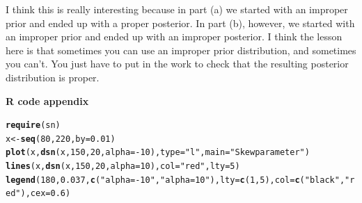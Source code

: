 \documentclass[12pt]{article}\usepackage[]{graphicx}\usepackage[]{color}
\makeatletter
\newcommand{\hlnum}[1]{\textcolor[rgb]{0.686,0.059,0.569}{#1}}%
\newcommand{\hlstr}[1]{\textcolor[rgb]{0.192,0.494,0.8}{#1}}%
\newcommand{\hlopt}[1]{\textcolor[rgb]{0,0,0}{#1}}%
\newcommand{\hlstd}[1]{\textcolor[rgb]{0.345,0.345,0.345}{#1}}%
\newcommand{\hlkwb}[1]{\textcolor[rgb]{0.69,0.353,0.396}{#1}}%
\newcommand{\hlkwc}[1]{\textcolor[rgb]{0.333,0.667,0.333}{#1}}%
\newcommand{\hlkwd}[1]{\textcolor[rgb]{0.737,0.353,0.396}{\textbf{#1}}}%
\newenvironment{kframe}{%
 \def\at@end@of@kframe{}%
 \ifinner\ifhmode%
  \def\at@end@of@kframe{\end{minipage}}%
  \begin{minipage}{\columnwidth}%
 \fi\fi%
 \def\FrameCommand##1{\hskip\@totalleftmargin \hskip-\fboxsep
 \colorbox{shadecolor}{##1}\hskip-\fboxsep
     \hskip-\linewidth \hskip-\@totalleftmargin \hskip\columnwidth}%
 \MakeFramed {\advance\hsize-\width
   \@totalleftmargin\z@ \linewidth\hsize
   \@setminipage}}%
 {\par\unskip\endMakeFramed%
 \at@end@of@kframe}
\newenvironment{knitrout}{}{} %
\makeatother
\begin{document}
\begin{doublespacing}
\begin{enumerate}
\begin{enumerate}
\begin{singlespace}
\begin{knitrout}
\end{knitrout}
\end{singlespace}

I think this is really interesting because in part (a) we started with an improper prior and ended up with a proper posterior. In part (b), however, we started with an improper prior and ended up with an improper posterior. I think the lesson here is that sometimes you can use an improper prior distribution, and sometimes you can't. You just have to put in the work to check that the resulting posterior distribution is proper.


\end{enumerate}

\end{enumerate}
\end{doublespacing}

\newpage
{\bf \large R code appendix}

\begin{knitrout}\footnotesize
{}\color{fgcolor}\begin{kframe}
\begin{alltt}
\hlkwd{require}\hlstd{(sn)}
\hlstd{x} \hlkwb{<-} \hlkwd{seq}\hlstd{(}\hlnum{80}\hlstd{,} \hlnum{220}\hlstd{,} \hlkwc{by}\hlstd{=}\hlnum{0.01}\hlstd{)}
\hlkwd{plot}\hlstd{(x,} \hlkwd{dsn}\hlstd{(x,} \hlnum{150}\hlstd{,} \hlnum{20}\hlstd{,} \hlkwc{alpha}\hlstd{=}\hlopt{-}\hlnum{10}\hlstd{),} \hlkwc{type}\hlstd{=}\hlstr{"l"}\hlstd{,} \hlkwc{main}\hlstd{=}\hlstr{"Skew parameter"}\hlstd{)}
\hlkwd{lines}\hlstd{(x,} \hlkwd{dsn}\hlstd{(x,} \hlnum{150}\hlstd{,} \hlnum{20}\hlstd{,} \hlkwc{alpha}\hlstd{=}\hlnum{10}\hlstd{),} \hlkwc{col}\hlstd{=}\hlstr{"red"}\hlstd{,} \hlkwc{lty}\hlstd{=}\hlnum{5}\hlstd{)}
\hlkwd{legend}\hlstd{(}\hlnum{180}\hlstd{,} \hlnum{0.037}\hlstd{,} \hlkwd{c}\hlstd{(}\hlstr{"alpha=-10"}\hlstd{,} \hlstr{"alpha=10"}\hlstd{),} \hlkwc{lty}\hlstd{=}\hlkwd{c}\hlstd{(}\hlnum{1}\hlstd{,}\hlnum{5}\hlstd{),} \hlkwc{col}\hlstd{=}\hlkwd{c}\hlstd{(}\hlstr{"black"}\hlstd{,} \hlstr{"red"}\hlstd{),} \hlkwc{cex}\hlstd{=}\hlnum{0.6}\hlstd{)}
\end{alltt}
\end{kframe}
\end{knitrout}
\end{document}

